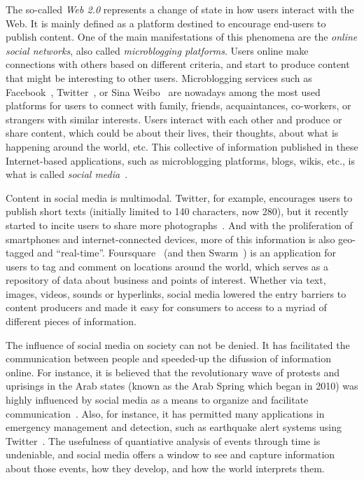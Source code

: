 \begin{intro}


The so-called {\em Web 2.0} represents a change of state in how users interact
with the Web.
%
It is mainly defined as a platform destined to encourage end-users to
publish content. 
%
One of the main manifestations of this phenomena are the {\em online social
networks}, also called {\em microblogging platforms}.
%
Users online make connections with others based on different criteria, and start
to produce content that might be interesting to other users. 
%
Microblogging services such as Facebook~\cite{facebook}, Twitter~\cite{twitter},
or Sina Weibo~\cite{weibo} are nowadays among the most used platforms for users
to connect with family, friends, acquaintances, co-workers, or strangers with
similar interests.   
%
Users interact with each other and produce or share content, which could be
about their lives, their thoughts, about what is happening around the world,
etc.    
%
This collective of information published in these Internet-based applications,
such as microblogging platforms, blogs, wikis, etc., is what is called {\em
social media}~\cite{kaplan2010users}.



Content in social media is multimodal. 
%
Twitter, for example, encourages users to publish short texts (initially limited
to 140 characters, now 280), but it recently started to incite users to share
more photographs~\cite{brown_2019}.
%  
And with the proliferation of smartphones and internet-connected devices, more
of this information is also geo-tagged and ``real-time''. 
%
Foursquare~\cite{foursquare} (and then
Swarm~\cite{swarm}) is an application for users to tag
and comment on locations around the world, which serves as a repository of data
about business and points of interest.
%
Whether via text, images, videos, sounds or hyperlinks, social media lowered the
entry barriers to content producers and made it easy for consumers to access to
a myriad of different pieces of information.





The influence of social media on society can not be denied. 
% 
It has facilitated the communication between people and speeded-up the difussion
of information online. 
%
For instance, it is believed that the revolutionary wave of protests and
uprisings in the Arab states (known as the Arab Spring which began in 2010) was
highly influenced by social media as a means to organize and facilitate
communication~\cite{howard2011opening}. 
%
Also, for instance, it has permitted many applications in emergency management
and detection, such as earthquake alert systems using
Twitter~\cite{Sakaki2010,Sarmiento:2018:DDE:3201064.3201077,Mendoza2019}.
%
The usefulness of quantiative analysis of events through time is undeniable, and
social media offers a window to see and capture information about those events,
how they develop, and how the world interprets them.




\end{intro}
